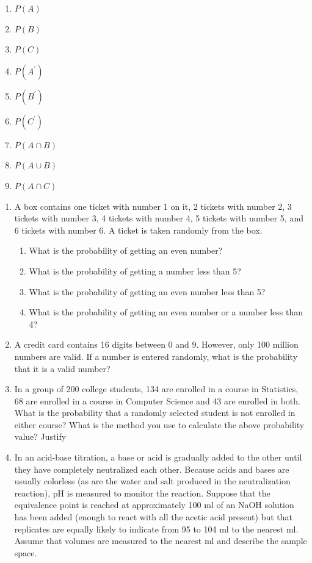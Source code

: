 \documentclass[]{book}
\providecommand{\tightlist}{%
  \setlength{\itemsep}{0pt}\setlength{\parskip}{0pt}}
\begin{document}
\begin{enumerate}
\def\labelenumi{(\alph{enumi})}
\tightlist
\item
  \(P(A)\)
\item
  \(P(B)\)
\item
  \(P(C)\)
\item
  \(P(A^\prime)\)
\item
  \(P(B^\prime)\)
\item
  \(P(C^\prime)\)
\item
  \(P(A\cap B)\)
\item
  \(P(A\cup B)\)
\item
  \(P(A\cap C)\)
\end{enumerate}

\begin{enumerate}
\def\labelenumi{\arabic{enumi}.}
\setcounter{enumi}{6}
\item
  A box contains one ticket with number 1 on it, 2 tickets with number 2, 3 tickets with number 3, 4 tickets with number 4, 5 tickets with number 5, and 6 tickets with number 6. A ticket is taken randomly from the box.

  \begin{enumerate}
  \def\labelenumii{(\alph{enumii})}
  \tightlist
  \item
    What is the probability of getting an even number?
  \item
    What is the probability of getting a number less than 5?
  \item
    What is the probability of getting an even number less than 5?
  \item
    What is the probability of getting an even number or a number less than 4?
  \end{enumerate}
\item
  A credit card contains 16 digits between 0 and 9. However, only 100 million numbers are valid. If a number is entered randomly, what is the probability that it is a valid number?
\item
  In a group of 200 college students, 134 are enrolled in a course in Statistics, 68 are enrolled in a course in Computer Science and 43 are enrolled in both. What is the probability that a randomly selected student is not enrolled in either course? What is the method you use to calculate the above probability value? Justify
\item
  In an acid-base titration, a base or acid is gradually added to the other until they have completely neutralized each other. Because acids and bases are usually colorless (as are the water and salt produced in the neutralization reaction), pH is measured to monitor the reaction. Suppose that the equivalence point is reached at approximately 100 ml of an NaOH solution has been added (enough to react with all the acetic acid present) but that replicates are equally likely to indicate from 95 to 104 ml to the nearest ml. Assume that volumes are measured to the nearest ml and describe the sample space.
\end{enumerate}
\end{document}
